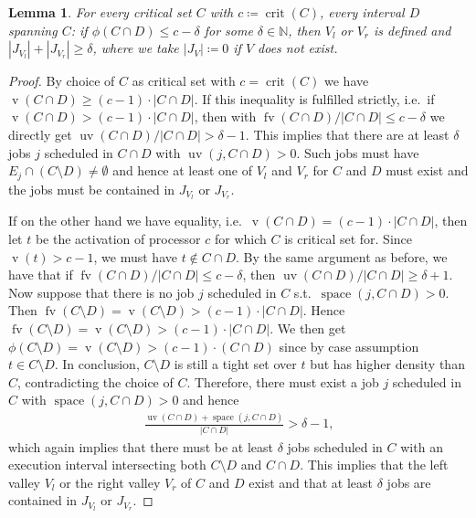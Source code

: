 \documentclass[a4paper]{article}
\DeclareMathOperator{\fv}{fv}
\DeclareMathOperator{\uv}{uv}
\DeclareMathOperator{\vol}{v}
\DeclareMathOperator{\crit}{crit}
\DeclareMathOperator{\spac}{space}
\newtheorem{lemma}[theorem]{Lemma}
\begin{document}
\begin{lemma}\label{lemma:valley}
  For every critical set $C$ with $c \coloneqq \crit(C)$, every interval $D$ spanning $C$:
  if $\phi(C \cap D) \leq c - \delta$ for some $\delta \in \mathbb{N}$, then $V_l$ or $V_r$ is defined and $|J_{V_l}| + |J_{V_r}| \geq \delta$, where we take $|J_V| \coloneqq 0$ if $V$ does not exist.
\end{lemma}
\begin{proof}
  By choice of $C$ as critical set with $c = \crit(C)$ we have $\vol(C \cap D) \geq (c-1) \cdot |C \cap D|$.
  If this inequality is fulfilled strictly, i.e.\ if
  $\vol(C \cap D) > (c-1) \cdot |C \cap D|$, then with
  $\fv(C \cap D) / |C \cap D| \leq c - \delta$ we directly get $\uv(C \cap D) / |C \cap D| > \delta - 1$.
  This implies that there are at least $\delta$ jobs $j$ scheduled in $C \cap D$ with $\uv(j, C \cap D) > 0$.
  Such jobs must have $E_j \cap (C \setminus D) \neq \emptyset$ and hence at least one of $V_l$ and $V_r$ for $C$ and $D$ must exist and the jobs must be contained in $J_{V_l}$ or $J_{V_r}$.

  If on the other hand we have equality, i.e.\ $\vol(C \cap D) = (c-1) \cdot |C \cap D|$, then let $t$ be the activation of processor $c$ for which $C$ is critical set for.
  Since $\vol(t) > c-1$, we must have $t \notin C \cap D$.
  By the same argument as before, we have that if $\fv(C \cap D) / |C \cap D| \leq c - \delta$, then $\uv(C \cap D) / |C \cap D| \geq \delta + 1$.
  Now suppose that there is no job $j$ scheduled in $C$ s.t.\ $\spac(j, C \cap D) > 0$.
  Then $\fv(C \setminus D) = \vol(C \setminus D) > (c-1) \cdot | C \cap D|$.
  Hence $\fv(C \setminus D) = \vol(C \setminus D) > (c - 1) \cdot |C \cap D|$.
  We then get $\phi(C \setminus D) = \vol(C \setminus D) > (c-1) \cdot (C \cap D)$ since by case assumption $t \in C \setminus D$.
  In conclusion, $C \setminus D$ is still a tight set over $t$ but has higher density than $C$, contradicting the choice of $C$.
  Therefore, there must exist a job $j$ scheduled in $C$ with $\spac(j, C \cap D) > 0$ and hence
  \begin{align}
    \frac
    {\uv(C \cap D) + \spac(j, C \cap D)}
    {|C \cap D|}
    > \delta - 1 \text{,}
  \end{align}
  which again implies that there must be at least $\delta$ jobs scheduled in $C$ with an execution interval intersecting both $C \setminus D$ and $C \cap D$.
  This implies that the left valley $V_l$ or the right valley $V_r$ of $C$ and $D$ exist and that at least $\delta$ jobs are contained in $J_{V_l}$ or $J_{V_r}$.
\end{proof}
\end{document}

